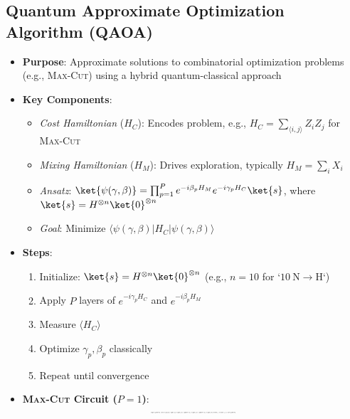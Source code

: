 \begin{multicols}{3}
    \section*{Quantum Approximate Optimization Algorithm (QAOA)}
    \begin{itemize}[leftmargin=*,nosep,topsep=0pt]
      \item \textbf{Purpose}: Approximate solutions to combinatorial
        optimization problems (e.g., \textsc{Max-Cut}) using a hybrid
        quantum-classical approach
      \item \textbf{Key Components}:
        \begin{itemize}[nosep]
          \item \textit{Cost Hamiltonian} ($H_C$): Encodes problem, e.g.,
            $H_C = \sum_{\langle i,j \rangle} Z_i Z_j$ for \textsc{Max-Cut}
          \item \textit{Mixing Hamiltonian} ($H_M$): Drives exploration,
            typically $H_M = \sum_i X_i$
          \item \textit{Ansatz}: $\ket{\psi(\gamma, \beta)} = \prod_{p=1}^P e^{-i\beta_p H_M} e^{-i\gamma_p H_C} \ket{s}$, where $\ket{s} = H^{\otimes n} \ket{0}^{\otimes n}$
          \item \textit{Goal}: Minimize $\langle \psi(\gamma, \beta) | H_C | \psi(\gamma, \beta) \rangle$
        \end{itemize}
      \item \textbf{Steps}:
        \begin{enumerate}[nosep]
          \item Initialize: $\ket{s} = H^{\otimes n} \ket{0}^{\otimes n}$
            (e.g., $n=10$ for `$10 \mathrm{~N} \rightarrow \mathrm{H}$`)
          \item Apply $P$ layers of $e^{-i\gamma_p H_C}$ and $e^{-i\beta_p H_M}$
          \item Measure $\langle H_C \rangle$
          \item Optimize $\gamma_p, \beta_p$ classically
          \item Repeat until convergence
        \end{enumerate}
      \item \textbf{\textsc{Max-Cut} Circuit ($P=1$)}:
        \[
          \resizebox{0.25\textwidth}{!}{
            \begin{quantikz}
              \lstick{$q_0$} & \gate{H} & \gate{e^{-i\gamma Z Z}} & \gate{e^{-i\gamma Z Z}} & \gate{R_X(2\beta)} & \meter{} \\

\end{quantikz}}\]
\end{itemize}
\end{multicols}
